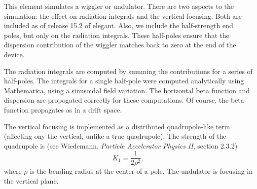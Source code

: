 This element simulates a wiggler or undulator.  There are two aspects
to the simulation: the effect on radiation integrals and the vertical
focusing.  Both are included as of release 15.2 of elegant.  Also, we
include the half-strength end poles, but only on the radiation
integrals.  These half-poles ensure that the dispersion contribution
of the wiggler matches back to zero at the end of the device.

The radiation integrals are computed by summing the contributions for
a series of half-poles.  The integrals for a single half-pole were
computed analytically using Mathematica, using a sinusoidal field
variation.  The horizontal beta function and dispersion are propogated
correctly for these computations.  Of course, the beta function
propagates as in a drift space.

The vertical focusing is implemented as a distributed quadrupole-like
term (affecting ony the vertical, unlike a true quadrupole).  The
strength of the quadrupole is (see Wiedemann, {\em Particle Accelerator
Physics II}, section 2.3.2)
\begin{equation}
K_1 = \frac{1}{2\rho^2},
\end{equation}
where $\rho$ is the bending radius at the center of a pole.  The
undulator is focusing in the vertical plane.
